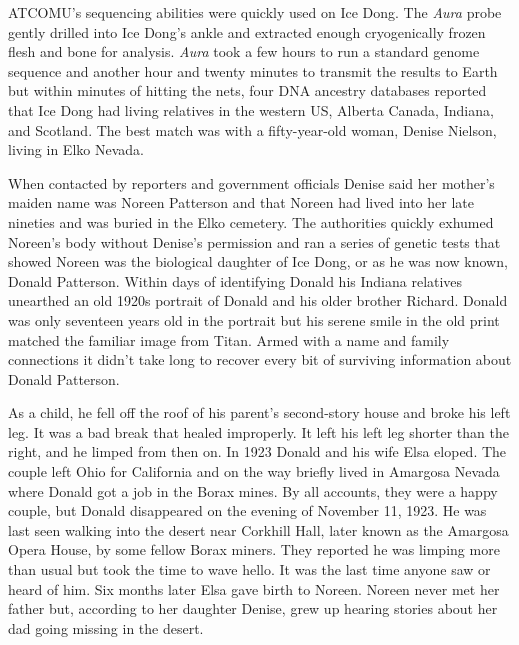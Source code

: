 ATCOMU's sequencing abilities were quickly used on Ice Dong. The
\emph{Aura} probe gently drilled into Ice Dong's ankle and extracted
enough cryogenically frozen flesh and bone for analysis. \emph{Aura}
took a few hours to run a standard genome sequence and another hour and
twenty minutes to transmit the results to Earth but within minutes of
hitting the nets, four DNA ancestry databases reported that Ice Dong had
living relatives in the western US, Alberta Canada, Indiana, and
Scotland. The best match was with a fifty-year-old woman, Denise
Nielson, living in Elko Nevada.

When contacted by reporters and government officials Denise said her
mother's maiden name was Noreen Patterson and that Noreen had lived into
her late nineties and was buried in the Elko cemetery. The authorities
quickly exhumed Noreen's body without Denise's permission and ran a
series of genetic tests that showed Noreen was the biological daughter
of Ice Dong, or as he was now known, Donald Patterson. Within days of
identifying Donald his Indiana relatives unearthed an old 1920s portrait
of Donald and his older brother Richard. Donald was only seventeen years
old in the portrait but his serene smile in the old print matched the
familiar image from Titan. Armed with a name and family connections it
didn't take long to recover every bit of surviving information about
Donald Patterson.

As a child, he fell off the roof of his parent's second-story house and
broke his left leg. It was a bad break that healed improperly. It left
his left leg shorter than the right, and he limped from then on. In 1923
Donald and his wife Elsa eloped. The couple left Ohio for California and
on the way briefly lived in Amargosa Nevada where Donald got a job in
the Borax mines. By all accounts, they were a happy couple, but Donald
disappeared on the evening of November 11, 1923. He was last seen
walking into the desert near Corkhill Hall, later known as the Amargosa
Opera House, by some fellow Borax miners. They reported he was limping
more than usual but took the time to wave hello. It was the last time
anyone saw or heard of him. Six months later Elsa gave birth to Noreen.
Noreen never met her father but, according to her daughter Denise, grew
up hearing stories about her dad going missing in the desert.

